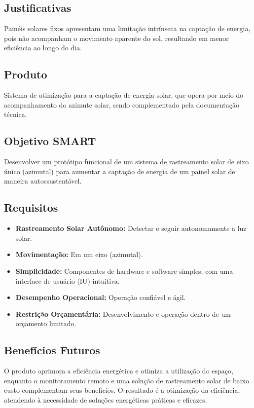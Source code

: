 \documentclass{article}
\begin{document}
\subsection{Justificativas}
Painéis solares fixos apresentam uma limitação intrínseca na captação de energia, pois não acompanham o movimento aparente do sol, resultando em menor eficiência ao longo do dia.

\subsection{Produto}
Sistema de otimização para a captação de energia solar, que opera por meio do acompanhamento do azimute solar, sendo complementado pela documentação técnica.

\subsection{Objetivo SMART}
Desenvolver um protótipo funcional de um sistema de rastreamento solar de eixo único (azimutal) para aumentar a captação de energia de um painel solar de maneira autossustentável.

\subsection{Requisitos}
\begin{itemize}
    \item \textbf{Rastreamento Solar Autônomo:} Detectar e seguir autonomamente a luz solar.
    \item \textbf{Movimentação:} Em um eixo (azimutal).
    \item \textbf{Simplicidade:} Componentes de hardware e software simples, com uma interface de usuário (IU) intuitiva.
    \item \textbf{Desempenho Operacional:} Operação confiável e ágil.
    \item \textbf{Restrição Orçamentária:} Desenvolvimento e operação dentro de um orçamento limitado.
\end{itemize}

\subsection{Benefícios Futuros}
O produto aprimora a eficiência energética e otimiza a utilização do espaço, enquanto o monitoramento remoto e uma solução de rastreamento solar de baixo custo complementam seus benefícios. O resultado é a otimização da eficiência, atendendo à necessidade de soluções energéticas práticas e eficazes.
\end{document}
